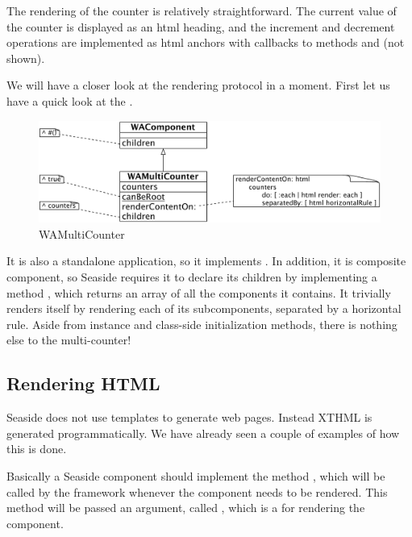 \documentclass[a4paper,10pt,twoside]{book}
\begin{document}
The rendering of the counter is relatively straightforward.
The current value of the counter is displayed as an html heading, and the increment and decrement operations are implemented as html anchors with callbacks to methods  and  (not shown).

We will have a closer look at the rendering protocol in a moment.
First let us have a quick look at the .

\begin{figure}[ht]
\begin{center}
\includegraphics[width=\textwidth]{WAMultiCounter}
\caption{WAMultiCounter}
\label{fig:WAMultiCounter}
\end{center}
\end{figure}

It is also a standalone application, so it implements .
In addition, it is composite component, so Seaside requires it to declare its children by implementing a method , which returns an array of all the components it contains.
It trivially renders itself by rendering each of its subcomponents, separated by a horizontal rule.
Aside from instance and class-side initialization methods, there is nothing else to the multi-counter!

\subsection{Rendering HTML}

Seaside does not use templates to generate web pages.
Instead XTHML is generated programmatically.
We have already seen a couple of examples of how this is done.

Basically a Seaside component should implement the method , which will be called by the framework whenever the component needs to be rendered.
This method will be passed an argument, called , which is a  for rendering the component.
\end{document}
